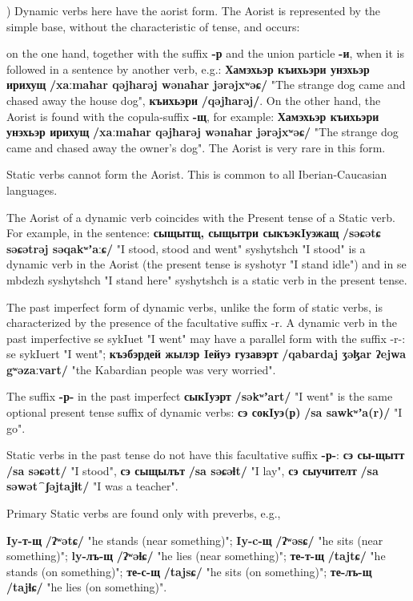 \documentclass[a4paper,12pt]{book}
\newcommand{\1}[1]{\textbf{\emph{#1}}} %
\newcommand{\2}[1]{\textbf{[#1]}} %
\newcommand{\3}[1]{\fontsize{11pt}{0cm}\textbf{\emph{#1}}} %
\newcommand{\4}[1]{\fontsize{10pt}{0cm}\emph{#1}}	%
\newcommand{\5}[1]{\textbf{/#1/}} %
\newcommand{\6}[1]{\textbf{[#1]}} %
\newcommand{\7}[1]{\fontsize{12pt}{0cm}\emph{#1}} %
\newcommand{\8}[1]{\fontsize{12pt}{0cm}`#1'} %
\newcommand{\9}[1]{\fontsize{12pt}{0cm}(lit. `#1')} %
\newcommand{\glossphonemics}[1]{\textbf{/#1/}} %
\begin{document}
\begin{xlist}

) Dynamic verbs here have the aorist form. The Aorist is represented by the simple base, without the characteristic of tense, and occurs:

on the one hand, together with the suffix \textbf{-р} and the union particle \textbf{-и}, when it is followed in a sentence by another verb, e.g.: \textbf{Хамэхьэр къихьэри унэхьэр ирихущ} \glossphonemics{xaːmaħar qəjħarəj wənaħar jərəjxʷəɕ} "The strange dog came and chased away the house dog", \textbf{къихьэри} \glossphonemics{qəjħarəj}. On the other hand, the Aorist is found with the copula-suffix \textbf{-щ}, for example:  \textbf{Хамэхьэр къихьэри унэхьэр ирихущ} \glossphonemics{xaːmaħar qəjħarəj wənaħar jərəjxʷəɕ} "The strange dog came and chased away the owner's dog". The Aorist is very rare in this form.

Static verbs cannot form the Aorist. This is common to all Iberian-Caucasian languages.

The Aorist of a dynamic verb coincides with the Present tense of a Static verb. For example, in the sentence: \textbf{сыщытщ, сыщытри сыкъэкIуэжащ} \glossphonemics{səɕətɕ səɕətrəj səqakʷʼaːɕ} "I stood, stood and went" syshytshch "I stood" is a dynamic verb in the Aorist (the present tense is syshotyr "I stand idle") and in se mbdezh syshytshch "I stand here" syshytshch is a static verb in the present tense.

\ex The past imperfect form of dynamic verbs, unlike the form of static verbs, is characterized by the presence of the facultative suffix -r. A dynamic verb in the past imperfective se sykIuet "I went" may have a parallel form with the suffix -r-: se sykIuert "I went"; \textbf{къэбэрдей жылэр Iейуэ гузавэрт} \glossphonemics{qabardaj ʒəɮar ʔejwa gʷəzaːvart} "the Kabardian people was very worried".

The suffix \textbf{-р-} in the past imperfect \textbf{сыкIуэрт} \glossphonemics{səkʷʼart} "I went" is the same optional present tense suffix of dynamic verbs: \textbf{сэ сокIуэ(р)} \glossphonemics{sa sawkʷʼa(r)} "I go".

Static verbs in the past tense do not have this facultative suffix \textbf{-р-}: \textbf{сэ сы-щытт} \glossphonemics{sa səɕətt} "I stood", \textbf{сэ сыщылът} \glossphonemics{sa səɕəɬt} "I lay", \textbf{сэ сыучителт} \glossphonemics{sa səwət⁀ʃəjtajɬt} "I was a teacher".

\ex Primary Static verbs are found only with preverbs, e.g., 
\begin{xlist}
\ex \textbf{Iy-т-щ} \glossphonemics{ʔʷətɕ} "he stands (near something)"; \textbf{Iy-c-щ} \glossphonemics{ʔʷəsɕ} "he sits (near something)"; \textbf{ly-лъ-щ} \glossphonemics{ʔʷəɬɕ} "he lies (near something)"; 
\ex \textbf{те-т-щ} \glossphonemics{tajtɕ} "he stands (on something)"; \textbf{те-с-щ} \glossphonemics{tajsɕ} "he sits (on something)"; \textbf{те-лъ-щ} \glossphonemics{tajɬɕ} "he lies (on something)".
\end{xlist}


\end{xlist}
\end{document}

